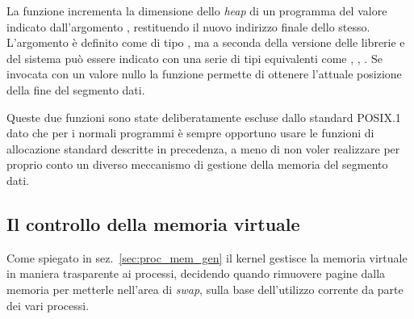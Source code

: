 La funzione incrementa la dimensione dello \textit{heap} di un programma del
valore indicato dall'argomento , restituendo il nuovo
indirizzo finale dello stesso.  L'argomento è definito come di tipo
, ma a seconda della versione delle librerie e del sistema
può essere indicato con una serie di tipi equivalenti come ,
, . Se invocata con un valore nullo la funzione
permette di ottenere l'attuale posizione della fine del segmento dati.

Queste due funzioni sono state deliberatamente escluse dallo standard POSIX.1
dato che per i normali programmi è sempre opportuno usare le funzioni di
allocazione standard descritte in precedenza, a meno di non voler realizzare
per proprio conto un diverso meccanismo di gestione della memoria del segmento
dati.


\subsection{Il controllo della memoria virtuale}  
\label{sec:proc_mem_lock}


Come spiegato in sez.~\ref{sec:proc_mem_gen} il kernel gestisce la memoria
virtuale in maniera trasparente ai processi, decidendo quando rimuovere pagine
dalla memoria per metterle nell'area di \textit{swap}, sulla base
dell'utilizzo corrente da parte dei vari processi.

